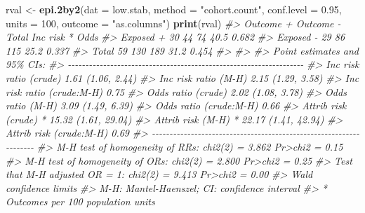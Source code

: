 \documentclass[
]{article}
\newenvironment{Shaded}{\begin{snugshade}}{\end{snugshade}}
\newcommand{\CommentTok}[1]{\textcolor[rgb]{0.56,0.35,0.01}{\textit{#1}}}
\newcommand{\DataTypeTok}[1]{\textcolor[rgb]{0.13,0.29,0.53}{#1}}
\newcommand{\DecValTok}[1]{\textcolor[rgb]{0.00,0.00,0.81}{#1}}
\newcommand{\FloatTok}[1]{\textcolor[rgb]{0.00,0.00,0.81}{#1}}
\newcommand{\KeywordTok}[1]{\textcolor[rgb]{0.13,0.29,0.53}{\textbf{#1}}}
\newcommand{\NormalTok}[1]{#1}
\newcommand{\StringTok}[1]{\textcolor[rgb]{0.31,0.60,0.02}{#1}}
\begin{document}
\begin{Shaded}
\begin{Highlighting}[]
\NormalTok{rval \textless{}{-}}\StringTok{ }\KeywordTok{epi.2by2}\NormalTok{(}\DataTypeTok{dat =}\NormalTok{ low.stab, }\DataTypeTok{method =} \StringTok{"cohort.count"}\NormalTok{, }\DataTypeTok{conf.level =} \FloatTok{0.95}\NormalTok{, }
   \DataTypeTok{units =} \DecValTok{100}\NormalTok{, }\DataTypeTok{outcome =} \StringTok{"as.columns"}\NormalTok{)}
\KeywordTok{print}\NormalTok{(rval)}
\CommentTok{\#\textgreater{}              Outcome +    Outcome {-}      Total        Inc risk *        Odds}
\CommentTok{\#\textgreater{} Exposed +           30           44         74              40.5       0.682}
\CommentTok{\#\textgreater{} Exposed {-}           29           86        115              25.2       0.337}
\CommentTok{\#\textgreater{} Total               59          130        189              31.2       0.454}
\CommentTok{\#\textgreater{} }
\CommentTok{\#\textgreater{} }
\CommentTok{\#\textgreater{} Point estimates and 95\% CIs:}
\CommentTok{\#\textgreater{} {-}{-}{-}{-}{-}{-}{-}{-}{-}{-}{-}{-}{-}{-}{-}{-}{-}{-}{-}{-}{-}{-}{-}{-}{-}{-}{-}{-}{-}{-}{-}{-}{-}{-}{-}{-}{-}{-}{-}{-}{-}{-}{-}{-}{-}{-}{-}{-}{-}{-}{-}{-}{-}{-}{-}{-}{-}{-}{-}{-}{-}{-}{-}{-}{-}{-}{-}}
\CommentTok{\#\textgreater{} Inc risk ratio (crude)                       1.61 (1.06, 2.44)}
\CommentTok{\#\textgreater{} Inc risk ratio (M{-}H)                         2.15 (1.29, 3.58)}
\CommentTok{\#\textgreater{} Inc risk ratio (crude:M{-}H)                   0.75}
\CommentTok{\#\textgreater{} Odds ratio (crude)                           2.02 (1.08, 3.78)}
\CommentTok{\#\textgreater{} Odds ratio (M{-}H)                             3.09 (1.49, 6.39)}
\CommentTok{\#\textgreater{} Odds ratio (crude:M{-}H)                       0.66}
\CommentTok{\#\textgreater{} Attrib risk (crude) *                        15.32 (1.61, 29.04)}
\CommentTok{\#\textgreater{} Attrib risk (M{-}H) *                          22.17 (1.41, 42.94)}
\CommentTok{\#\textgreater{} Attrib risk (crude:M{-}H)                      0.69}
\CommentTok{\#\textgreater{} {-}{-}{-}{-}{-}{-}{-}{-}{-}{-}{-}{-}{-}{-}{-}{-}{-}{-}{-}{-}{-}{-}{-}{-}{-}{-}{-}{-}{-}{-}{-}{-}{-}{-}{-}{-}{-}{-}{-}{-}{-}{-}{-}{-}{-}{-}{-}{-}{-}{-}{-}{-}{-}{-}{-}{-}{-}{-}{-}{-}{-}{-}{-}{-}{-}{-}{-}}
\CommentTok{\#\textgreater{}  M{-}H test of homogeneity of RRs: chi2(2) = 3.862 Pr\textgreater{}chi2 = 0.15}
\CommentTok{\#\textgreater{}  M{-}H test of homogeneity of ORs: chi2(2) = 2.800 Pr\textgreater{}chi2 = 0.25}
\CommentTok{\#\textgreater{}  Test that M{-}H adjusted OR = 1:  chi2(2) = 9.413 Pr\textgreater{}chi2 = 0.00}
\CommentTok{\#\textgreater{}  Wald confidence limits}
\CommentTok{\#\textgreater{}  M{-}H: Mantel{-}Haenszel; CI: confidence interval}
\CommentTok{\#\textgreater{}  * Outcomes per 100 population units}
\end{Highlighting}
\end{Shaded}
\end{document}
